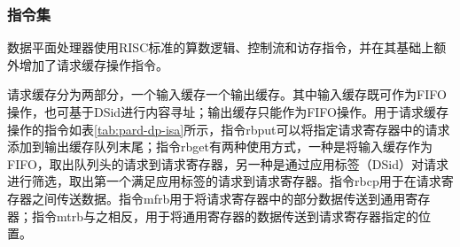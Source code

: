 \subsubsection{指令集}
数据平面处理器使用RISC标准的算数逻辑、控制流和访存指令，并在其基础上额外增加了请求缓存操作指令。

请求缓存分为两部分，一个输入缓存一个输出缓存。其中输入缓存既可作为FIFO操作，也可基于DSid进行内容寻址；输出缓存只能作为FIFO操作。用于请求缓存操作的指令如表\ref{tab:pard-dp-isa}所示，指令rbput可以将指定请求寄存器中的请求添加到输出缓存队列末尾；指令rbget有两种使用方式，一种是将输入缓存作为FIFO，取出队列头的请求到请求寄存器，另一种是通过应用标签（DSid）对请求进行筛选，取出第一个满足应用标签的请求到请求寄存器。指令rbcp用于在请求寄存器之间传送数据。指令mfrb用于将请求寄存器中的部分数据传送到通用寄存器；指令mtrb与之相反，用于将通用寄存器的数据传送到请求寄存器指定的位置。

